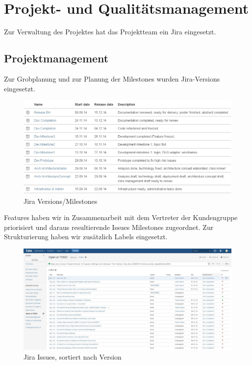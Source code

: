 \chapter{Projekt- und Qualitätsmanagement}
	\label{cap:projectmanagement}
	
	Zur Verwaltung des Projektes hat das Projektteam ein Jira eingesetzt.
	
	\section{Projektmanagement}
		Zur Grobplanung und zur Planung der Milestones wurden Jira-Versions eingesetzt.
		
		\begin{figure}[H]
			\includegraphics[width=\textwidth]{projectPlan/media/img/jiraVersions.jpg}
			\centering
			\caption{Jira Versions/Milestones}
			\label{fig:jiraVersions}
		\end{figure}
		
		Features haben wir in Zusammenarbeit mit dem Vertreter der Kundengruppe priorisiert und daraus resultierende Issues Milestones zugeordnet.
		Zur Strukturierung haben wir zusätzlich Labels eingesetzt.
		
		\begin{figure}[H]
			\includegraphics[width=\textwidth]{projectPlan/media/img/jiraIssuesOpenOrTodo.jpg}
			\centering
			\caption{Jira Issues, sortiert nach Version}
			\label{fig:jiraIssuesOpenOrTodo}
		\end{figure}
		
